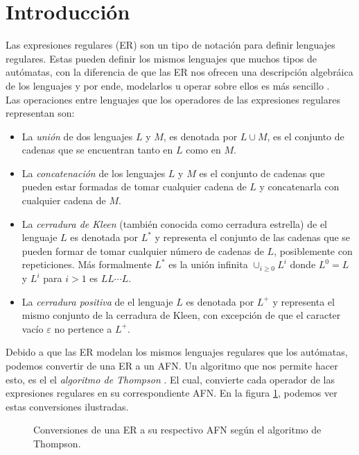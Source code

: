\section{Introducción}

Las expresiones regulares (ER) son un tipo de notación para definir lenguajes regulares. Estas pueden definir los mismos lenguajes que muchos tipos de autómatas, con la diferencia de que las ER nos ofrecen una descripción algebráica de los lenguajes y por ende, modelarlos u operar sobre ellos es más sencillo \cite{automatas}. \\

Las operaciones entre lenguajes que los operadores de las expresiones regulares representan son:

\begin{itemize}
	\item La \textit{unión} de dos lenguajes $L$ y $M$, es denotada por $L \cup M$, es el conjunto de cadenas que se encuentran tanto en $L$ como en $M$.
	\item La \textit{concatenación} de los lenguajes $L$ y $M$ es el conjunto de cadenas que pueden estar formadas de tomar cualquier cadena de $L$ y concatenarla con cualquier cadena de $M$.
	\item La \textit{cerradura de Kleen} (también conocida como cerradura estrella) de el lenguaje $L$ es denotada por $L^{*}$ y representa el conjunto de las cadenas que se pueden formar de tomar cualquier número de cadenas de $L$, posiblemente con repeticiones. Más formalmente $L^{*}$ es la unión infinita $\cup_{i \geq 0} L^{i}$ donde $L^{0} = L$ y $L^{i}$ para $i > 1$ es $LL \cdots L$.
	\item La \textit{cerradura positiva} de el lenguaje $L$ es denotada por $L^{+}$ y representa el mismo conjunto de la cerradura de Kleen, con excepción de que el caracter vacío $\varepsilon$ no pertence a $L^{+}$.
\end{itemize}

Debido a que las ER modelan los mismos lenguajes regulares que los autómatas, podemos convertir de una ER a un AFN. Un algoritmo que nos permite hacer esto, es el el \textit{algoritmo de Thompson} \cite{compiladores}. El cual, convierte cada operador de las expresiones regulares en su correspondiente AFN. En la figura \ref{fig:thompson}, podemos ver estas conversiones ilustradas.

\begin{figure}[H]
	\caption{Conversiones de una ER a su respectivo AFN según el algoritmo de Thompson.}
	\label{fig:thompson}
\end{figure}








